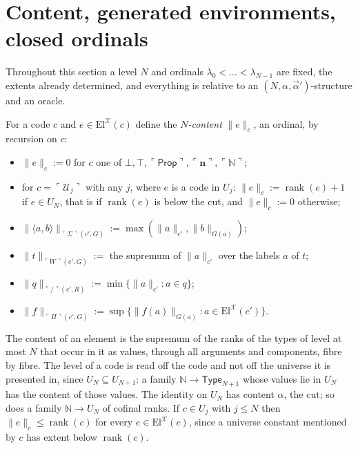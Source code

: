 \documentclass[10pt]{article}
\newcommand{\N}{\mathbb{N}}
\newcommand{\Prop}{\mathsf{Prop}}
\newcommand{\Type}{\mathsf{Type}}
\newcommand{\rk}{\operatorname{rank}}
\newcommand{\El}{\mathrm{El}}
\newcommand{\code}[1]{\ulcorner #1\urcorner}
\newcommand{\U}{\mathcal{U}}
\newcommand{\X}{\mathcal{X}}
\begin{document}
\section{Content, generated environments, closed ordinals}\label{sec:closed}

Throughout this section a level $N$ and ordinals
$\lambda_0<\dots<\lambda_{N-1}$ are fixed, the extents already
determined, and everything is relative to an
$(N,\alpha,\vec\alpha')$-structure and an oracle.

\begin{definition}[content]\label{def:content}
For a code $c$ and $e\in\El^\X(c)$ define the \emph{$N$-content}
$\|e\|_c$, an ordinal, by recursion on $c$:
\begin{itemize}
\item $\|e\|_c:=0$ for $c$ one of $\bot,\top,\code\Prop,\code{\mathbf n},\code\N$;
\item for $c=\code{\U_j}$ with any $j$, where $e$ is a code in $U_j$:
  $\|e\|_c:=\rk(e)+1$ if $e\in U_N$, that is if $\rk(e)$ is below the
  cut, and $\|e\|_c:=0$ otherwise;
\item $\|\langle a,b\rangle\|_{\code\Sigma(c',G)}:=\max(\|a\|_{c'},\|b\|_{G(a)})$;
\item $\|t\|_{\code W(c',G)}:=$ the supremum of $\|a\|_{c'}$ over the labels
  $a$ of $t$;
\item $\|q\|_{\code/(c',R)}:=\min\{\|a\|_{c'}:a\in q\}$;
\item $\|f\|_{\code\Pi(c',G)}:=\sup\{\|f(a)\|_{G(a)}:a\in\El^\X(c')\}$.
\end{itemize}
\end{definition}

The content of an element is the supremum of the ranks of the types of
level at most $N$ that occur in it as values, through all arguments and
components, fibre by fibre. The level of a code is read off the code and
not off the universe it is presented in, since $U_N\subseteq U_{N+1}$: a
family $\N\to\Type_{N+1}$ whose values lie in $U_N$ has the content of
those values. The identity on $U_N$ has content $\alpha$, the cut; so
does a family $\N\to U_N$ of cofinal ranks. If $c\in U_j$ with $j\le N$
then $\|e\|_c\le\rk(c)$ for every $e\in\El^\X(c)$, since a universe
constant mentioned by $c$ has extent below $\rk(c)$.
\end{document}
